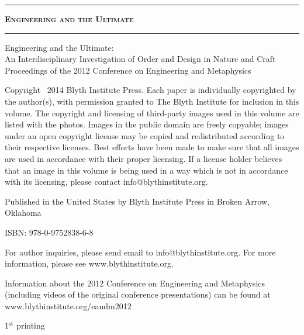 \begin{titlepage}
\begingroup

\setlength{\parindent}{0cm}
\setlength{\parskip}{1em}

\vspace*{\fill}
\begin{center}
\hrule
{\LARGE \textsc{\textbf{Engineering and the Ultimate}}}
\baselineskip
\hrule
\end{center}
\vspace*{\fill}

\clearpage %

\thispagestyle{empty}
\vspace*{\fill}

{\small
Engineering and the Ultimate: \\ An Interdisciplinary Investigation of Order and Design in Nature and Craft \\ Proceedings of the 2012 Conference on Engineering and Metaphysics

Copyright \textcopyright\ 2014 Blyth Institute Press.  Each paper is individually copyrighted by the author(s), with permission granted to The Blyth Institute for inclusion in this volume.  The copyright and licensing of third-party images used in this volume are listed with the photos.  Images in the public domain are freely copyable; images under an open copyright license may be copied and redistributed according to their respective licenses.  Best efforts have been made to make sure that all images are used in accordance with their proper licensing.  If a license holder believes that an image in this volume is being used in a way which is not in accordance with its licensing, please contact info@blythinstitute.org.

Published in the United States by Blyth Institute Press in Broken Arrow, Oklahoma


ISBN: 978-0-9752838-6-8

For author inquiries, please send email to info@blythinstitute.org.  For more information, please see www.blythinstitute.org.

Information about the 2012 Conference on Engineering and Metaphysics (including videos of the original conference presentations) can be found at www.blythinstitute.org/eandm2012

\baselineskip

1$^{\textrm{st}}$ printing}


\end{titlepage}
